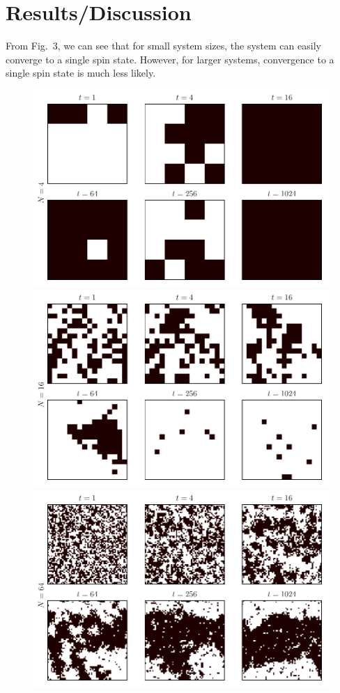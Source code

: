\documentclass{llncs}
\begin{document}
\newpage
\section{Results/Discussion}

From Fig.~3, we can see that for small system sizes, the system can easily converge to a single spin state. However, for larger systems, convergence to a single spin state is much less likely. 

\begin{figure}[h!]
	\centering
\includegraphics[scale=0.25]{images/image4_0_0.pdf}
\includegraphics[scale=0.25]{images/image16_0_0.pdf}
\includegraphics[scale=0.25]{images/image64_0_0.pdf}

\end{figure}
\end{document}
